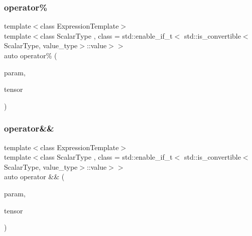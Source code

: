 \mbox{\label{classbc_1_1tensors_1_1Expression__Base_ad6b9d5f43e904cd9c7e61a897644ecd4}} 
\subsubsection{\texorpdfstring{operator\%}{operator\%}}
{\footnotesize\ttfamily template$<$class Expression\+Template$>$ \\
template$<$class Scalar\+Type , class  = std\+::enable\+\_\+if\+\_\+t$<$   std\+::is\+\_\+convertible$<$\+Scalar\+Type, value\+\_\+type$>$\+::value$>$$>$ \\
auto operator\% (\begin{DoxyParamCaption}\item[{const Scalar\+Type \&}]{param,  }\item[{const \hyperlink{classbc_1_1tensors_1_1Expression__Base}{Expression\+\_\+\+Base}$<$ Expression\+Template $>$ \&}]{tensor }\end{DoxyParamCaption})\hspace{0.3cm}{\ttfamily [friend]}}

\mbox{\label{classbc_1_1tensors_1_1Expression__Base_ad7e1f92a9e331758dc8d3dd4b644dff7}} 
\subsubsection{\texorpdfstring{operator\&\&}{operator\&\&}}
{\footnotesize\ttfamily template$<$class Expression\+Template$>$ \\
template$<$class Scalar\+Type , class  = std\+::enable\+\_\+if\+\_\+t$<$   std\+::is\+\_\+convertible$<$\+Scalar\+Type, value\+\_\+type$>$\+::value$>$$>$ \\
auto operator \&\& (\begin{DoxyParamCaption}\item[{const Scalar\+Type \&}]{param,  }\item[{const \hyperlink{classbc_1_1tensors_1_1Expression__Base}{Expression\+\_\+\+Base}$<$ Expression\+Template $>$ \&}]{tensor }\end{DoxyParamCaption})\hspace{0.3cm}{\ttfamily [friend]}}

